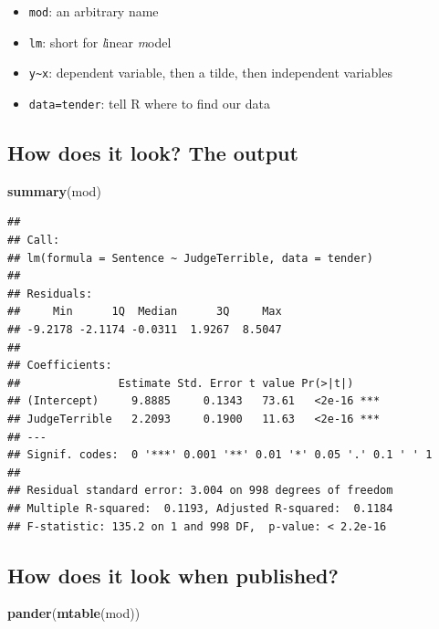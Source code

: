 \documentclass[12pt,twoside]{article}
\newenvironment{Shaded}{}{}
\newcommand{\KeywordTok}[1]{\textcolor[rgb]{0.00,0.44,0.13}{\textbf{{#1}}}}
\newcommand{\NormalTok}[1]{{#1}}
\providecommand{\tightlist}{%
  \setlength{\itemsep}{0pt}\setlength{\parskip}{0pt}}
\begin{document}
\begin{itemize}
\tightlist
\item
  \texttt{mod}: an arbitrary name
\item
  \texttt{lm}: short for \emph{l}inear \emph{m}odel
\item
  \texttt{y\textasciitilde{}x}: dependent variable, then a tilde, then
  independent variables
\item
  \texttt{data=tender}: tell R where to find our data
\end{itemize}

\subsection{How does it look? The
output}\label{how-does-it-look-the-output}

\small

\begin{Shaded}
\begin{Highlighting}[]
\KeywordTok{summary}\NormalTok{(mod)}
\end{Highlighting}
\end{Shaded}

\begin{verbatim}
## 
## Call:
## lm(formula = Sentence ~ JudgeTerrible, data = tender)
## 
## Residuals:
##     Min      1Q  Median      3Q     Max 
## -9.2178 -2.1174 -0.0311  1.9267  8.5047 
## 
## Coefficients:
##               Estimate Std. Error t value Pr(>|t|)    
## (Intercept)     9.8885     0.1343   73.61   <2e-16 ***
## JudgeTerrible   2.2093     0.1900   11.63   <2e-16 ***
## ---
## Signif. codes:  0 '***' 0.001 '**' 0.01 '*' 0.05 '.' 0.1 ' ' 1
## 
## Residual standard error: 3.004 on 998 degrees of freedom
## Multiple R-squared:  0.1193, Adjusted R-squared:  0.1184 
## F-statistic: 135.2 on 1 and 998 DF,  p-value: < 2.2e-16
\end{verbatim}

\subsection{How does it look when
published?}\label{how-does-it-look-when-published}

\small

\begin{Shaded}
\begin{Highlighting}[]
\KeywordTok{pander}\NormalTok{(}\KeywordTok{mtable}\NormalTok{(mod))}
\end{Highlighting}
\end{Shaded}
\end{document}
